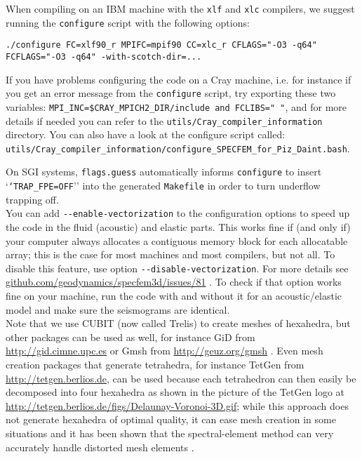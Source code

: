 When compiling on an IBM machine with the \texttt{xlf} and \texttt{xlc}
compilers, we suggest running the \texttt{configure} script with the
following options:

{\footnotesize
\begin{verbatim}
./configure FC=xlf90_r MPIFC=mpif90 CC=xlc_r CFLAGS="-O3 -q64" FCFLAGS="-O3 -q64" -with-scotch-dir=...
\end{verbatim}
}

If you have problems configuring the code on a Cray machine, i.e. for instance if you get an error message from the \texttt{configure} script, try exporting these two variables:
\texttt{MPI\_INC=\${CRAY\_MPICH2\_DIR}/include and FCLIBS=" "}, and for more details if needed you can refer to the \texttt{utils/Cray\_compiler\_information} directory.
You can also have a look at the configure script called:\\
\texttt{utils/Cray\_compiler\_information/configure\_SPECFEM\_for\_Piz\_Daint.bash}.

On SGI systems, \texttt{flags.guess} automatically informs \texttt{configure}
to insert `\texttt{`TRAP\_FPE=OFF}'' into the generated \texttt{Makefile}
in order to turn underflow trapping off.\\

You can add \texttt{-{}-enable-vectorization} to the configuration options to speed up the code in the fluid (acoustic) and elastic parts.
This works fine if (and only if) your computer always allocates a contiguous memory block for each allocatable array;
this is the case for most machines and most compilers, but not all. To disable this feature, use option \texttt{-{}-disable-vectorization}.
For more details see \href{https://github.com/geodynamics/specfem3d/issues/81}{github.com/geodynamics/specfem3d/issues/81} .
To check if that option works fine on your machine, run the code with and without it for an acoustic/elastic model and make sure the seismograms are identical.\\


Note that we use CUBIT (now called Trelis) to create meshes of hexahedra, but other packages
can be used as well, for instance GiD from \url{http://gid.cimne.upc.es}
or Gmsh from \url{http://geuz.org/gmsh} \citep{GeRe09}. Even mesh
creation packages that generate tetrahedra, for instance TetGen from
\url{http://tetgen.berlios.de}, can be used because each tetrahedron
can then easily be decomposed into four hexahedra as shown in the
picture of the TetGen logo at \url{http://tetgen.berlios.de/figs/Delaunay-Voronoi-3D.gif};
while this approach does not generate hexahedra of optimal quality,
it can ease mesh creation in some situations and it has been shown
that the spectral-element method can very accurately handle distorted
mesh elements \citep{OlSe11}.\\

